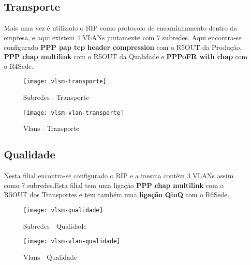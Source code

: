 \documentclass[11pt]{article}
\begin{document}
        \pagebreak
        
	\subsection{Transporte}
	\normalsize
	\paragraph{}
        Mais uma vez é utilizado o RIP como protocolo de encaminhamento dentro da empresa, e aqui existem 4 VLANs juntamente com 7 subredes. Aqui encontra-se configurado \textbf{PPP pap tcp header compression} com o R5OUT da Produção, \textbf{PPP chap multilink} com o R5OUT da Qualidade e \textbf{PPPoFR with chap} com o R4Sede.

        \begin{figure}[h]
          \centering
          \texttt{[image: vlsm-transporte]}
          \caption{Subredes - Transporte}
          \label{fig.nav}
        \end{figure}

        \begin{figure}[h]
          \centering
          \texttt{[image: vlsm-vlan-transporte]}
          \caption{Vlans - Transporte}
          \label{fig.nav}
	\end{figure}


 	\subsection{Qualidade}
	\normalsize
	\paragraph{}
        Nesta filial encontra-se configurado o RIP e a mesma contêm 3 VLANs assim como 7 subredes.Esta filial tem uma ligação \textbf{PPP chap multilink} com o R5OUT dos Transportes e tem também uma \textbf{ligação QinQ} com o R6Sede.

        \begin{figure}[h]
          \centering
          \texttt{[image: vlsm-qualidade]}
          \caption{Subredes - Qualidade}
          \label{fig.nav}
        \end{figure}

        \begin{figure}[h]
          \centering
          \texttt{[image: vlsm-vlan-qualidade]}
          \caption{Vlans - Qualidade}
          \label{fig.nav}
	\end{figure}
\end{document}
